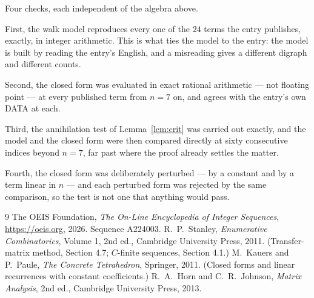 \documentclass[11pt,a4paper]{article}
\theoremstyle{plain}
\theoremstyle{definition}
\begin{document}
Four checks, each independent of the algebra above.

First, the walk model reproduces every one of the $24$ terms the entry publishes,
exactly, in integer arithmetic. This is what ties the model to the entry: the model is built
by reading the entry's English, and a misreading gives a different digraph and different
counts.

Second, the closed form was evaluated in exact rational arithmetic --- not floating point ---
at every published term from $n=7$ on, and agrees with the entry's own DATA at each.

Third, the annihilation test of Lemma~\ref{lem:crit} was carried out exactly, and the model
and the closed form were then compared directly at sixty consecutive indices beyond
$n=7$, far past where the proof already settles the matter.

Fourth, the closed form was deliberately perturbed --- by a constant and by a term linear in
$n$ --- and each perturbed form was rejected by the same comparison, so the test is not one
that anything would pass.

\begin{thebibliography}{9}
 The OEIS Foundation, \emph{The On-Line Encyclopedia of Integer
Sequences}, \url{https://oeis.org}, 2026. Sequence A224003.
 R.~P.~Stanley, \emph{Enumerative Combinatorics}, Volume 1, 2nd ed.,
Cambridge University Press, 2011. (Transfer-matrix method, Section 4.7; $C$-finite sequences,
Section 4.1.)
 M.~Kauers and P.~Paule, \emph{The Concrete Tetrahedron}, Springer, 2011.
(Closed forms and linear recurrences with constant coefficients.)
 R.~A.~Horn and C.~R.~Johnson, \emph{Matrix Analysis}, 2nd ed., Cambridge
University Press, 2013.
\end{thebibliography}
\end{document}
